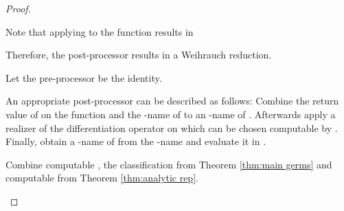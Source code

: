 \documentclass{eptcs-modified}
\begin{document}
\begin{proof}
\begin{description}
						Note that applying  to the function  results in
						
						Therefore, the post-processor  results in a Weihrauch reduction.
					\item[:]
						Let the pre-processor be the identity.

						An appropriate post-processor can be described as follows: Combine the return value of  on the function  and the -name of  to an -name of .
						Afterwards apply a realizer of the differentiation operator on  which can be chosen computable by .
						Finally, obtain a -name of  from the -name and evaluate it in .
					\item[:] Combine computable , the classification  from Theorem \ref{thm:main germs} and computable  from Theorem \ref{thm:analytic rep}.
				\end{description}
			\end{proof}
\end{document}
